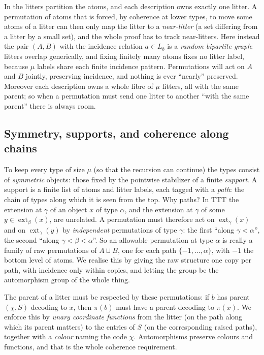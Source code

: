 \documentclass[11pt]{article}
\theoremstyle{definition}
\theoremstyle{remark}
\newcommand{\TTT}{\mathrm{TTT}}
\newcommand{\ext}{\operatorname{ext}}
\begin{document}
In \cite{HW} the litters partition the atoms, and each description owns
exactly one litter. A permutation of atoms that is forced, by coherence at
lower types, to move some atoms of a litter can then only map the litter
to a \emph{near-litter} (a set differing from a litter by a small set),
and the whole proof has to track near-litters. Here instead the pair
\((A,B)\) with the incidence relation \(a\in L_b\) is a \emph{random
bipartite graph}: litters overlap generically, and fixing finitely many
atoms fixes no litter label, because \(\mu\) labels share each finite
incidence pattern. Permutations will act on \(A\) and
\(B\) jointly, preserving incidence, and nothing is ever ``nearly''
preserved. Moreover each description owns a whole fibre of \(\mu\) litters,
all with the same parent; so when a permutation must send one litter to
another ``with the same parent'' there is always room.

\subsection{Symmetry, supports, and coherence along chains}
To keep every type of size \(\mu\) (so that the recursion can continue)
the types consist of \emph{symmetric} objects: those fixed by the pointwise
stabilizer of a finite \emph{support}. A support is a finite list of atoms
and litter labels, each tagged with a \emph{path}: the chain of types along
which it is seen from the top. Why paths? In \(\TTT\) the extension at
\(\gamma\) of an object \(x\) of type \(\alpha\), and the extension at
\(\gamma\) of some \(y\in\ext_\beta(x)\), are unrelated. A permutation
must therefore act on \(\ext_\gamma(x)\) and on \(\ext_\gamma(y)\) by
\emph{independent} permutations of type \(\gamma\): the first ``along
\(\gamma<\alpha\)'', the second ``along \(\gamma<\beta<\alpha\)''. So an
allowable permutation at type \(\alpha\) is really a family of raw
permutations of \(A\sqcup B\), one for each path \(\{-1,\dots,\alpha\}\),
with \(-1\) the bottom level of atoms. We realise this by giving the raw
structure one copy per path, with incidence only within copies, and letting
the group be the automorphism group of the whole thing.

The parent of a litter must be respected by these permutations: if
\(b\) has parent \((\chi,S)\) decoding to \(x\), then \(\pi(b)\) must have
a parent decoding to \(\pi(x)\). We enforce this by \emph{unary coordinate
functions} from the litter (on the path along which its parent matters)
to the entries of \(S\) (on the corresponding raised paths), together with
a \emph{colour} naming the code \(\chi\). Automorphisms preserve colours
and functions, and that is the whole coherence requirement.
\end{document}
